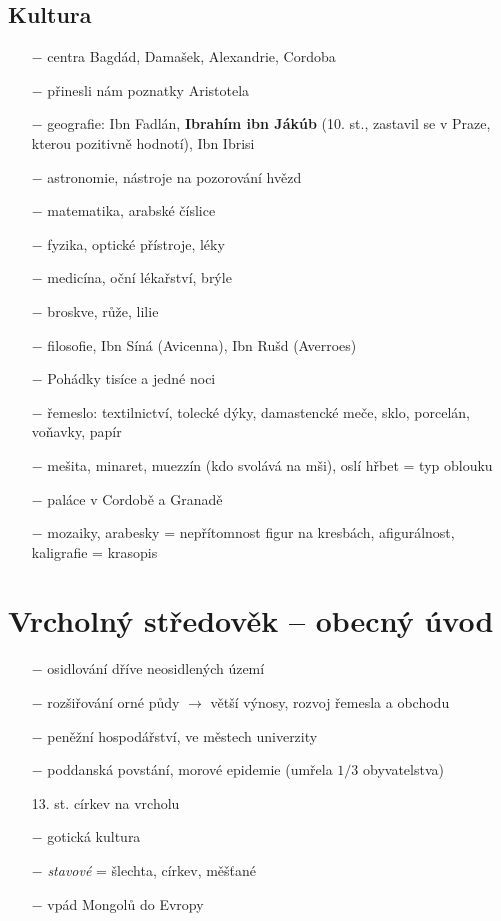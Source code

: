\documentclass{article}
\begin{document}
\subsection*{Kultura}
\begin{itemize}
    \vspace{-0.5em}
    \setlength\itemsep{0.15em}
    \item[$-$] centra Bagdád, Damašek, Alexandrie, Cordoba
    \item[$-$] přinesli nám poznatky Aristotela
    \item[$-$] geografie: Ibn Fadlán, \textbf{Ibrahím ibn Jákúb} (10. st., zastavil se v Praze, kterou pozitivně hodnotí), Ibn Ibrisi
    \item[$-$] astronomie, nástroje na pozorování hvězd
    \item[$-$] matematika, arabské číslice
    \item[$-$] fyzika, optické přístroje, léky
    \item[$-$] medicína, oční lékařství, brýle
    \item[$-$] broskve, růže, lilie
    \item[$-$] filosofie, Ibn Síná (Avicenna), Ibn Rušd (Averroes)
    \item[$-$] Pohádky tisíce a jedné noci
    \item[$-$] řemeslo: textilnictví, tolecké dýky, damastencké meče, sklo, porcelán, voňavky, papír
    \item[$-$] mešita, minaret, muezzín (kdo svolává na mši), oslí hřbet = typ oblouku
    \item[$-$] paláce v Cordobě a Granadě
    \item[$-$] mozaiky, arabesky = nepřítomnost figur na kresbách, afigurálnost, kaligrafie = krasopis
\end{itemize}

\section*{Vrcholný středověk -- obecný úvod}
\begin{itemize}
    \vspace{-0.5em}
    \setlength\itemsep{0.15em}
    \item[$-$] osidlování dříve neosidlených území
    \item[$-$] rozšiřování orné půdy $\rightarrow$ větší výnosy, rozvoj řemesla a obchodu
    \item[$-$] peněžní hospodářství,  ve městech univerzity
    \item[$-$] poddanská povstání, morové epidemie (umřela $1 / 3$ obyvatelstva)
    \item[13. st.] církev na vrcholu
    \item[$-$] gotická kultura
    \item[$-$] \textit{stavové} = šlechta, církev, měšťané
    \item[$-$] vpád Mongolů do Evropy
\end{itemize}
\end{document}
